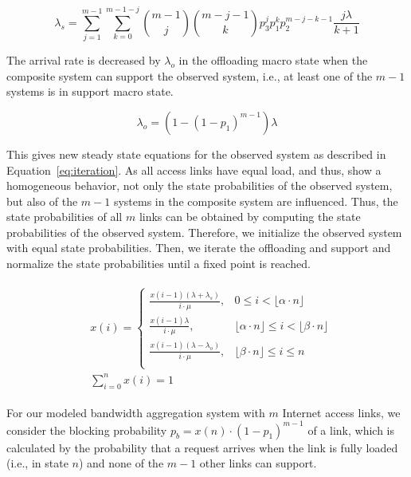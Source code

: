 \small
\begin{equation}
\lambda_{s} = \sum_{j=1}^{m-1}\sum_{k=0}^{m-1-j} \binom{m-1}{j}\binom{m-j-1}{k}p^j_3 p^k_1 p_2^{m-j-k-1}\frac{j\lambda}{k+1}
\label{eq:lambda_s}
\end{equation}
\normalsize

The arrival rate is decreased by $\lambda_o$ in the offloading macro state when the composite system can support the observed system, i.e., at least one of the $m-1$ systems is in support macro state.

\begin{equation}
\lambda_{o} = (1-(1-p_1)^{m-1})\lambda
\end{equation}

This gives new steady state equations for the observed system as described in Equation~\ref{eq:iteration}. As all access links have equal load, and thus, show a homogeneous behavior, not only the state probabilities of the observed system, but also of the $m-1$ systems in the composite system are influenced. Thus, the state probabilities of all $m$ links can be obtained by computing the state probabilities of the observed system. Therefore, we initialize the observed system with equal state probabilities. Then, we iterate the offloading and support and normalize the state probabilities  until a fixed point is reached.

\begin{align}
\begin{split}
&x(i)=
\begin{cases}
\frac{x(i-1)(\lambda+\lambda_s)}{i\cdot\mu}, &0\leq i < \lfloor\alpha\cdot n\rfloor \\
\frac{x(i-1)\lambda}{i\cdot\mu}, &\lfloor\alpha\cdot n\rfloor\leq i < \lfloor\beta\cdot n\rfloor \\
\frac{x(i-1)(\lambda-\lambda_o)}{i\cdot\mu}, &\lfloor\beta\cdot n\rfloor \leq i \leq n \\
\end{cases}\\
&\sum_{i=0}^n x(i) = 1
\end{split}
\label{eq:iteration}
\end{align}

For our modeled bandwidth aggregation system with $m$ Internet access links, we consider the blocking probability $p_{b} = x(n)\cdot (1-p_1)^{m-1}$ of a link, which is calculated by the probability that a request arrives when the link is fully loaded (i.e., in state $n$) and none of the $m-1$ other links can support.

